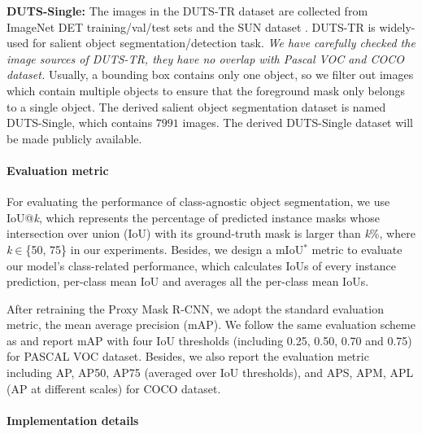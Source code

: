 \documentclass[final]{cvpr}
\begin{document}
\textbf{DUTS-Single:} The images in the DUTS-TR dataset \cite{wang2017learning} are collected from ImageNet DET \cite{deng2009imagenet} training/val/test sets and the SUN dataset \cite{5539970}. DUTS-TR is widely-used for salient object segmentation/detection task. \textit{We have carefully checked the image sources of DUTS-TR, they have no overlap with Pascal VOC and COCO dataset.} Usually, a bounding box contains only one object, so we filter out images which contain multiple objects to ensure that the foreground mask only belongs to a single object. The derived salient object segmentation dataset is named  DUTS-Single, which contains $7991$ images. The derived DUTS-Single dataset will be made publicly available.



\vspace{-3mm}
\paragraph{Evaluation metric}

For evaluating the performance of class-agnostic object segmentation, we use IoU@\emph{k}, which represents the percentage of predicted instance masks whose intersection over union (IoU) with its ground-truth mask is larger than \emph{k}\%, where \emph{k}$\in$\{50, 75\} in our experiments. Besides, we design a mIoU$^{*}$ metric to evaluate our model's class-related performance, which calculates IoUs of every instance prediction, per-class mean IoU and averages all the per-class mean IoUs.





After retraining the Proxy Mask R-CNN, we adopt the standard evaluation metric, the mean average precision (mAP). We follow the same evaluation scheme as \cite{hsu2019weakly} and report mAP with four IoU thresholds (including 0.25, 0.50, 0.70 and 0.75) for PASCAL VOC dataset. Besides, we also report the evaluation metric including AP, AP50, AP75 (averaged over IoU thresholds), and APS, APM, APL (AP at different scales) for COCO dataset.





\vspace{-3mm}
\paragraph{Implementation details}
\vspace{-1mm}
\end{document}
